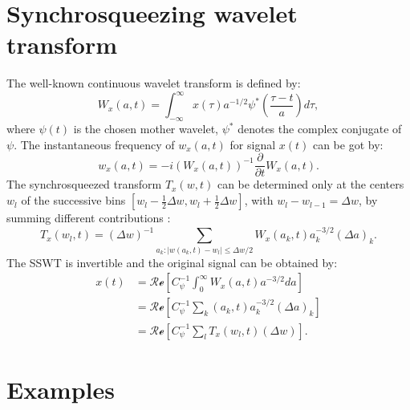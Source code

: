 \section{Synchrosqueezing wavelet transform}
The well-known continuous wavelet transform is defined by:
\begin{equation}
\label{eq:w1t}
W_x(a,t)=\int_{-\infty}^{\infty}x(\tau)a^{-1/2}\psi^*\left(\frac{\tau-t}{a}\right)d\tau,
\end{equation}
where $\psi(t)$ is the chosen mother wavelet, $\psi^*$ denotes the complex conjugate of $\psi$. The instantaneous frequency of $w_x(a,t)$ for signal $x(t)$ can be got by:
\begin{equation}
\label{eq:instf}
w_x(a,t) = -i(W_x(a,t))^{-1}\frac{\partial}{\partial t}W_x(a,t).
\end{equation}
The synchrosqueezed transform $T_x(w,t)$ can be determined only at the centers $w_l$ of the successive bins $[w_l-\frac{1}{2}\Delta w,w_l+\frac{1}{2}\Delta w]$, with $w_l-w_{l-1}=\Delta w$, by summing
different contributions \cite[]{daubechies2011}:
\begin{equation}
\label{eq:sswt}
T_x(w_l,t)=(\Delta w)^{-1} \sum_{a_k:|w(a_k,t)-w_l|\le \Delta w/2}^{} W_x(a_k,t)a_k^{-3/2}(\Delta a)_k.
\end{equation}
The SSWT is invertible and the original signal can be obtained by:
\begin{equation}
\label{eq:sswt}
\begin{split}
x(t) &= \mathcal{Re}\left[C_{\psi}^{-1}\int_{0}^{\infty}W_x(a,t)a^{-3/2}da\right] \\
	 &=\mathcal{Re}\left[C_{\psi}^{-1}\sum_{k}(a_k,t)a_k^{-3/2}(\Delta a)_k\right] \\
     &=\mathcal{Re}\left[C_{\psi}^{-1}\sum_{l}T_x(w_l,t)(\Delta w)\right].
\end{split}
\end{equation}

\section{Examples}
